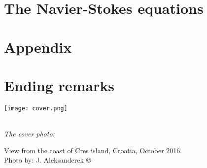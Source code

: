 \documentclass[12pt]{report}
\begin{document}


\chapter{The Navier-Stokes equations}



\chapter*{Appendix}

\newpage
\thispagestyle{empty}

\chapter*{Ending remarks}



\begin{flushright}


\texttt{[image: cover.png]}

\setlength{\parskip}{0.1em}
\setlength{\parindent}{0cm}
\ \\[0.5cm]
\textit{The cover photo:}  

View from the coast of Cres island, Croatia, October 2016.
\ \\[0.1cm]
Photo by: J. Aleksanderek $\copyright$
\end{flushright}





\end{document}
